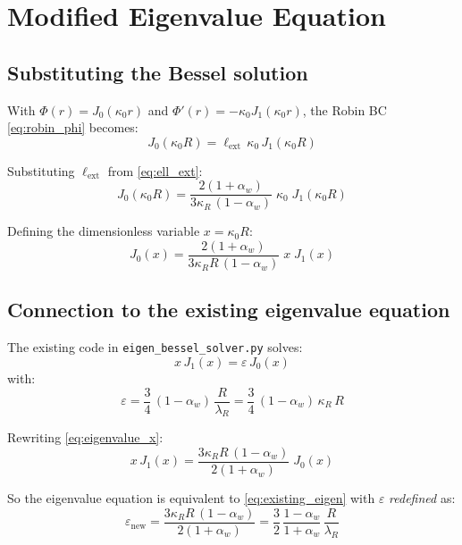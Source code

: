 \documentclass[12pt]{article}
\newcommand{\Rcm}{R}
\newcommand{\lR}{\lambda_R}
\newcommand{\lext}{\ell_{\mathrm{ext}}}
\newcommand{\alphaW}{\alpha_w}
\begin{document}
\section{Modified Eigenvalue Equation}

\subsection{Substituting the Bessel solution}

With $\Phi(r) = J_0(\kappa_0 r)$ and $\Phi'(r) = -\kappa_0 J_1(\kappa_0 r)$,
the Robin BC \eqref{eq:robin_phi} becomes:
\begin{equation}
    J_0(\kappa_0 R) = \lext\,\kappa_0\,J_1(\kappa_0 R)
\end{equation}

Substituting $\lext$ from \eqref{eq:ell_ext}:
\begin{equation}
    \boxed{J_0(\kappa_0 R) = \frac{2(1 + \alphaW)}{3\kappa_R\,(1 - \alphaW)}
    \;\kappa_0\;J_1(\kappa_0 R)}
    \label{eq:eigenvalue_full}
\end{equation}

Defining the dimensionless variable $x = \kappa_0 R$:
\begin{equation}
    J_0(x) = \frac{2(1 + \alphaW)}{3\kappa_R R\,(1 - \alphaW)}\;x\;J_1(x)
    \label{eq:eigenvalue_x}
\end{equation}

\subsection{Connection to the existing eigenvalue equation}

The existing code in \texttt{eigen\_bessel\_solver.py} solves:
\begin{equation}
    x\,J_1(x) = \varepsilon\,J_0(x)
    \label{eq:existing_eigen}
\end{equation}
with:
\begin{equation}
    \varepsilon = \frac{3}{4}\,(1 - \alphaW)\,\frac{\Rcm}{\lR}
    = \frac{3}{4}\,(1 - \alphaW)\,\kappa_R\,\Rcm
    \label{eq:existing_epsilon}
\end{equation}

Rewriting \eqref{eq:eigenvalue_x}:
\begin{equation}
    x\,J_1(x) = \frac{3\kappa_R R\,(1 - \alphaW)}{2(1 + \alphaW)}\;J_0(x)
\end{equation}

So the eigenvalue equation is equivalent to \eqref{eq:existing_eigen} with
$\varepsilon$ \emph{redefined} as:
\begin{equation}
    \boxed{\varepsilon_{\mathrm{new}} = \frac{3\kappa_R R\,(1 - \alphaW)}{2(1 + \alphaW)}
    = \frac{3}{2}\,\frac{1 - \alphaW}{1 + \alphaW}\,\frac{R}{\lR}}
    \label{eq:epsilon_new}
\end{equation}
\end{document}
